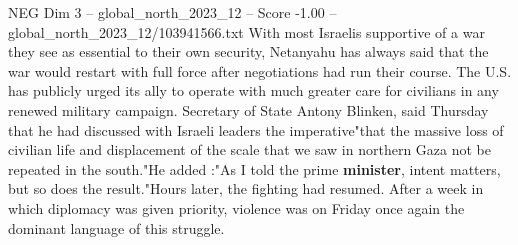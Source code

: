\begin{textsample}{NEG Dim 3 – global\_north\_2023\_12 – Score -1.00 – global\_north\_2023\_12/103941566.txt}
With most Israelis supportive of a war they see as essential to their own security, Netanyahu has always said that the war would restart with full force after negotiations had run their course.
The U.S. has publicly urged its ally to operate with much greater care for civilians in any renewed military campaign.
Secretary of State Antony Blinken, said Thursday that he had discussed with Israeli leaders the imperative"that the massive loss of civilian life and displacement of the scale that we saw in northern Gaza not be repeated in the south."He added :"As I told the prime \textbf{minister}, intent matters, but so does the result."Hours later, the fighting had resumed.
After a week in which diplomacy was given priority, violence was on Friday once again the dominant language of this struggle.

\end{textsample}
